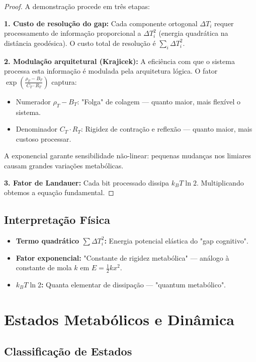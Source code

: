 \documentclass[11pt,a4paper]{article}
\newcommand{\rhoT}{\rho_T}
\newcommand{\BT}{B_T}
\newcommand{\CT}{C_T}
\newcommand{\RT}{R_T}
\newcommand{\DeltaT}{\Delta T}
\newcommand{\kB}{k_B}
\begin{document}
\begin{proof}
A demonstração procede em três etapas:

\textbf{1. Custo de resolução do gap:} Cada componente ortogonal $\DeltaT_i$ requer processamento de informação proporcional a $\DeltaT_i^2$ (energia quadrática na distância geodésica). O custo total de resolução é $\sum_i \DeltaT_i^2$.

\textbf{2. Modulação arquitetural (Krajicek):} A eficiência com que o sistema processa esta informação é modulada pela arquitetura lógica. O fator $\exp\left( \frac{\rhoT - \BT}{\CT \cdot \RT} \right)$ captura:
\begin{itemize}
    \item Numerador $\rhoT - \BT$: "Folga" de colagem — quanto maior, mais flexível o sistema.
    \item Denominador $\CT \cdot \RT$: Rigidez de contração e reflexão — quanto maior, mais custoso processar.
\end{itemize}
A exponencial garante sensibilidade não-linear: pequenas mudanças nos limiares causam grandes variações metabólicas.

\textbf{3. Fator de Landauer:} Cada bit processado dissipa $\kB T \ln 2$. Multiplicando obtemos a equação fundamental.
\end{proof}

\subsection{Interpretação Física}

\begin{itemize}
    \item \textbf{Termo quadrático $\sum \DeltaT_i^2$:} Energia potencial elástica do "gap cognitivo".
    \item \textbf{Fator exponencial:} "Constante de rigidez metabólica" — análogo à constante de mola $k$ em $E = \frac{1}{2}kx^2$.
    \item \textbf{$\kB T \ln 2$:} Quanta elementar de dissipação — "quantum metabólico".
\end{itemize}

\section{Estados Metabólicos e Dinâmica}

\subsection{Classificação de Estados}
\end{document}
